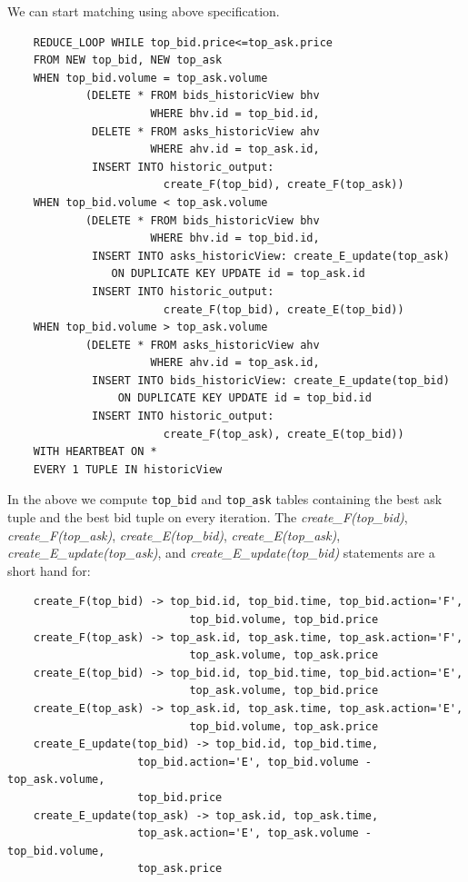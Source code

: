\documentclass{article}
\begin{document}
We can start matching using above specification.

\begin{verbatim}  
    REDUCE_LOOP WHILE top_bid.price<=top_ask.price
    FROM NEW top_bid, NEW top_ask
    WHEN top_bid.volume = top_ask.volume 
            (DELETE * FROM bids_historicView bhv 
                      WHERE bhv.id = top_bid.id,
             DELETE * FROM asks_historicView ahv 
                      WHERE ahv.id = top_ask.id,
             INSERT INTO historic_output: 
                        create_F(top_bid), create_F(top_ask))
    WHEN top_bid.volume < top_ask.volume 
            (DELETE * FROM bids_historicView bhv 
                      WHERE bhv.id = top_bid.id,
             INSERT INTO asks_historicView: create_E_update(top_ask) 
                ON DUPLICATE KEY UPDATE id = top_ask.id
             INSERT INTO historic_output:
                        create_F(top_bid), create_E(top_bid))
    WHEN top_bid.volume > top_ask.volume 
            (DELETE * FROM asks_historicView ahv 
                      WHERE ahv.id = top_ask.id,
             INSERT INTO bids_historicView: create_E_update(top_bid) 
                 ON DUPLICATE KEY UPDATE id = top_bid.id
             INSERT INTO historic_output:
                        create_F(top_ask), create_E(top_bid))
    WITH HEARTBEAT ON *
    EVERY 1 TUPLE IN historicView
\end{verbatim}

In the above we compute {\tt top\_bid} and {\tt top\_ask} tables containing the best ask tuple and the best bid tuple on every iteration. The \emph{create\_F(top\_bid)}, \emph{create\_F(top\_ask)}, \emph{create\_E(top\_bid)}, \emph{create\_E(top\_ask)}, \emph{create\_E\_update(top\_ask)}, and \emph{create\_E\_update(top\_bid)} statements are a short hand for:

\begin{verbatim}
    create_F(top_bid) -> top_bid.id, top_bid.time, top_bid.action='F',
                            top_bid.volume, top_bid.price
    create_F(top_ask) -> top_ask.id, top_ask.time, top_ask.action='F',
                            top_ask.volume, top_ask.price
    create_E(top_bid) -> top_bid.id, top_bid.time, top_bid.action='E',
                            top_ask.volume, top_bid.price
    create_E(top_ask) -> top_ask.id, top_ask.time, top_ask.action='E',
                            top_bid.volume, top_ask.price
    create_E_update(top_bid) -> top_bid.id, top_bid.time,
                    top_bid.action='E', top_bid.volume - top_ask.volume,
                    top_bid.price
    create_E_update(top_ask) -> top_ask.id, top_ask.time,
                    top_ask.action='E', top_ask.volume - top_bid.volume,
                    top_ask.price
\end{verbatim}
\end{document}
